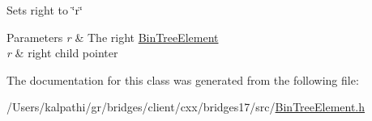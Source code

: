 Sets right to \char`\"{}r\char`\"{}
\begin{DoxyParams}{Parameters}
{\em r} & The right \mbox{\hyperlink{classbridges_1_1_bin_tree_element}{Bin\+Tree\+Element}}\\
\hline
{\em r} & right child pointer \\
\hline
\end{DoxyParams}


The documentation for this class was generated from the following file\+:\begin{DoxyCompactItemize}
\item 
/\+Users/kalpathi/gr/bridges/client/cxx/bridges17/src/\mbox{\hyperlink{_bin_tree_element_8h}{Bin\+Tree\+Element.\+h}}\end{DoxyCompactItemize}

